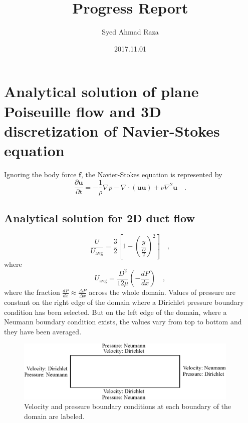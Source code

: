 \documentclass[12pt,a4paper,fleqn]{article}
\title{Progress Report}
\author{Syed Ahmad Raza}
\date{2017.11.01}
\begin{document}
\maketitle
\tableofcontents
\pagebreak

\section{Analytical solution of plane Poiseuille flow and 3D discretization of Navier-Stokes equation}

Ignoring the body force $\mathbf{f}$, the Navier-Stokes equation is represented by
\begin{equation}\label{eq:navier-stokes-no-f}
\frac {\partial \mathbf{u}}{\partial t} = -\frac{1}{\rho}\nabla p -\nabla \cdot (\mathbf{uu}) + \nu \nabla^2 \mathbf{u} \quad.
\end{equation}

\subsection{Analytical solution for 2D duct flow}
\begin{equation}\label{eq:analytical01}
\frac{U}{U_{\text{avg}}} = \frac{3}{2}\left[1-\left(\frac{y}{\tfrac{D}{2}}\right)^2\right] \quad,
\end{equation}
where
\begin{equation}\label{eq:analytical02}
U_{\text{avg}} = \frac{D^2}{12\mu}\left(-\frac{dP}{dx}\right) \quad,
\end{equation}
where the fraction \(\tfrac{dP}{dx}\approx\tfrac{\Delta P}{\Delta x}\) across the whole domain. Values of pressure are constant on the right edge of the domain where a Dirichlet pressure boundary condition has been selected. But on the left edge of the domain, where a Neumann boundary condition exists, the values vary from top to bottom and they have been averaged.

\begin{figure}[H]
	\centering
	\includegraphics[width=0.95\textwidth]{boundary_conditions.eps}
	\caption{Velocity and pressure boundary conditions at each boundary of the domain are labeled.}
	\label{fig:boundary-conditions}
\end{figure}
\end{document}
